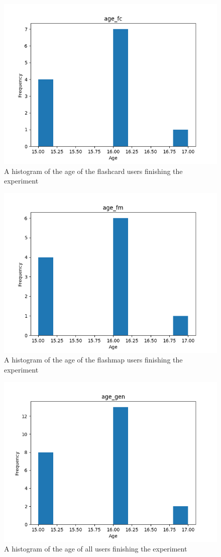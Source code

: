 \begin{figure}[htbp]
    \centering
    \includegraphics[width=.7\textwidth]{img/age_fc.png}
    \caption{A histogram of the age of the flashcard users finishing the experiment}
\end{figure}
\begin{figure}[htbp]
    \centering
    \includegraphics[width=.7\textwidth]{img/age_fm.png}
    \caption{A histogram of the age of the flashmap users finishing the experiment}
\end{figure}
\begin{figure}[htbp]
    \centering
    \includegraphics[width=.7\textwidth]{img/age_gen.png}
    \caption{A histogram of the age of all users finishing the experiment}
\end{figure}

